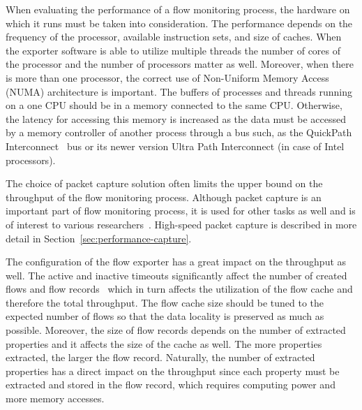When evaluating the performance of a flow monitoring process, the hardware on which it runs must be taken into consideration. The performance depends on the frequency of the processor, available instruction sets, and size of caches. When the exporter software is able to utilize multiple threads the number of cores of the processor and the number of processors matter as well. Moreover, when there is more than one processor, the correct use of Non-Uniform Memory Access (NUMA) architecture is important. The buffers of processes and threads running on a one CPU should be in a memory connected to the same CPU. Otherwise, the latency for accessing this memory is increased as the data must be accessed by a memory controller of another process through a bus such, as the QuickPath Interconnect~\cite{IntelCorporation-2009-Introduction} bus or its newer version Ultra Path Interconnect (in case of Intel processors).

The choice of packet capture solution often limits the upper bound on the throughput of the flow monitoring process. Although packet capture is an important part of flow monitoring process, it is used for other tasks as well and is of interest to various researchers~\cite{Garcia-Dorado-2013-High, Nassopulos-2014-Flow}. High-speed packet capture is described in more detail in Section~\ref{sec:performance-capture}.

The configuration of the flow exporter has a great impact on the throughput as well. The active and inactive timeouts significantly affect the number of created flows and flow records~\cite{Hofstede-2014-Flow} which in turn affects the utilization of the flow cache and therefore the total throughput. The flow cache size should be tuned to the expected number of flows so that the data locality is preserved as much as possible. Moreover, the size of flow records depends on the number of extracted properties and it affects the size of the cache as well. The more properties extracted, the larger the flow record. Naturally, the number of extracted properties has a direct impact on the throughput since each property must be extracted and stored in the flow record, which requires computing power and more memory accesses.

